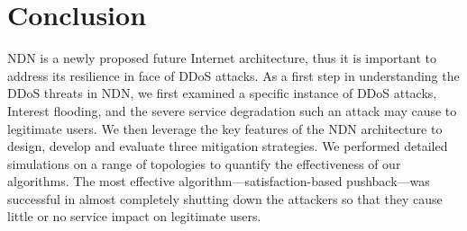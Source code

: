 \section{Conclusion}
\label{sec:conclusion}


%
%

NDN is a newly proposed future Internet architecture, thus it is important to address its resilience in face of DDoS attacks. As a first step in understanding the DDoS threats in NDN, we first examined a specific instance of DDoS attacks, Interest flooding, and the severe service degradation such an attack may cause to legitimate users. We then leverage the key features of the NDN architecture to design, develop and evaluate three mitigation strategies.
We performed detailed simulations on a range of topologies to quantify the effectiveness of our algorithms.   
The most effective algorithm---satisfaction-based pushback---was successful in almost completely shutting down the attackers so that they cause little or no service impact on legitimate users.


